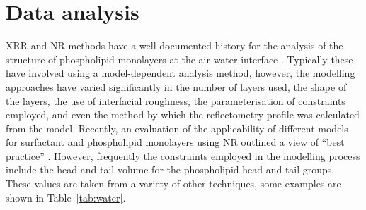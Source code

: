 \section{Data analysis}
\label{refl1:anal}
XRR and NR methods have a well documented history for the analysis of the structure of phospholipid monolayers at the air-water interface \cite{mohwald_phospholipid_1990,kewalramani_effects_2010,bayerl_specular_1990,johnson_structure_1991,clifton_role_2012,helm_phospholipid_1987,daillant_x-ray_1990}.
Typically these have involved using a model-dependent analysis method, however, the modelling approaches have varied significantly in the number of layers used, the shape of the layers, the use of interfacial roughness, the parameterisation of constraints employed, and even the method by which the reflectometry profile was calculated from the model.
Recently, an evaluation of the applicability of different models for surfactant and phospholipid monolayers using NR outlined a view of ``best practice'' \cite{campbell_structure_2018}.
However, frequently the constraints employed in the modelling process include the head and tail volume for the phospholipid head and tail groups.
These values are taken from a variety of other techniques, some examples are shown in Table~\ref{tab:water}.
%
